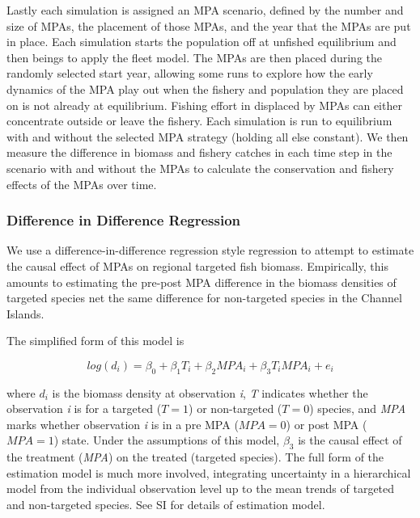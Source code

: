 \documentclass[9pt,twocolumn,twoside,lineno]{pnas-new}
\begin{document}
Lastly each simulation is assigned an MPA scenario, defined by the
number and size of MPAs, the placement of those MPAs, and the year that
the MPAs are put in place. Each simulation starts the population off at
unfished equilibrium and then beings to apply the fleet model. The MPAs
are then placed during the randomly selected start year, allowing some
runs to explore how the early dynamics of the MPA play out when the
fishery and population they are placed on is not already at equilibrium.
Fishing effort in displaced by MPAs can either concentrate outside or
leave the fishery. Each simulation is run to equilibrium with and
without the selected MPA strategy (holding all else constant). We then
measure the difference in biomass and fishery catches in each time step
in the scenario with and without the MPAs to calculate the conservation
and fishery effects of the MPAs over time.

\hypertarget{difference-in-difference-regression}{%
\subsubsection{Difference in Difference
Regression}\label{difference-in-difference-regression}}

We use a difference-in-difference regression style regression to attempt
to estimate the causal effect of MPAs on regional targeted fish biomass.
Empirically, this amounts to estimating the pre-post MPA difference in
the biomass densities of targeted species net the same difference for
non-targeted species in the Channel Islands.

The simplified form of this model is

\begin{equation}
  log(d_{i}) = \beta_0 + \beta_1T_{i} +  \beta_2MPA_{i} + \beta_{3}T_iMPA_i + e_{i}
\label{eq:did}
\end{equation}

where \(d_i\) is the biomass density at observation \emph{i}, \emph{T}
indicates whether the observation \emph{i} is for a targeted (\(T = 1\))
or non-targeted (\(T = 0\)) species, and \emph{MPA} marks whether
observation \emph{i} is in a pre MPA (\(MPA = 0\)) or post MPA
(\(MPA = 1\)) state. Under the assumptions of this model, \(\beta_3\) is
the causal effect of the treatment (\emph{MPA}) on the treated (targeted
species). The full form of the estimation model is much more involved,
integrating uncertainty in a hierarchical model from the individual
observation level up to the mean trends of targeted and non-targeted
species. See SI for details of estimation model.
\end{document}

